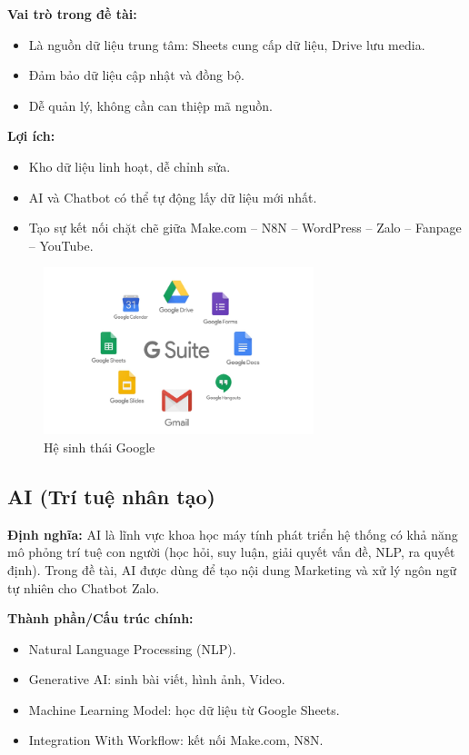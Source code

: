 \textbf{Vai trò trong đề tài:}
\begin{itemize}
    \item Là nguồn dữ liệu trung tâm: Sheets cung cấp dữ liệu, Drive lưu media.
    \item Đảm bảo dữ liệu cập nhật và đồng bộ.
    \item Dễ quản lý, không cần can thiệp mã nguồn.
\end{itemize}

\textbf{Lợi ích:}
\begin{itemize}
    \item Kho dữ liệu linh hoạt, dễ chỉnh sửa.
    \item AI và Chatbot có thể tự động lấy dữ liệu mới nhất.
    \item Tạo sự kết nối chặt chẽ giữa Make.com – N8N – WordPress – Zalo – Fanpage – YouTube.
\end{itemize}

\begin{figure}
\centering
    \includegraphics[width=0.7\textwidth]{img/gg.png}
    
    \caption{ Hệ sinh thái Google}
    \label{fig:gg}
\end{figure}



\subsection{AI (Trí tuệ nhân tạo)}

\textbf{Định nghĩa:} AI là lĩnh vực khoa học máy tính phát triển hệ thống có khả năng mô phỏng trí tuệ con người (học hỏi, suy luận, giải quyết vấn đề, NLP, ra quyết định). Trong đề tài, AI được dùng để tạo nội dung Marketing và xử lý ngôn ngữ tự nhiên cho Chatbot Zalo.

\textbf{Thành phần/Cấu trúc chính:}
\begin{itemize}
    \item Natural Language Processing (NLP).
    \item Generative AI: sinh bài viết, hình ảnh, Video.
    \item Machine Learning Model: học dữ liệu từ Google Sheets.
    \item Integration With Workflow: kết nối Make.com, N8N.
\end{itemize}

